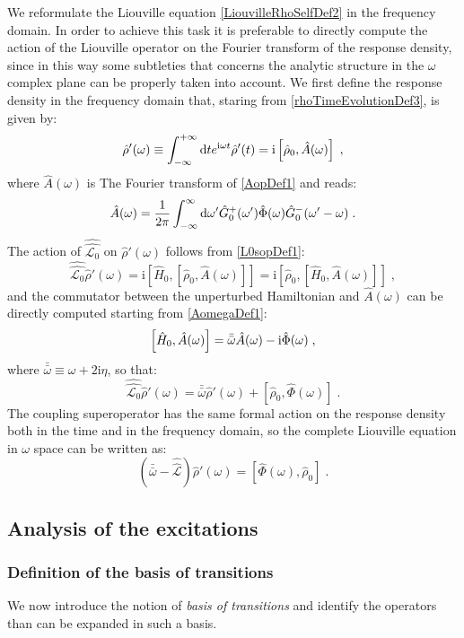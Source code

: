 \documentclass[a4paper]{article}
\newcommand{\dd}{{\rm d}}
\newcommand{\bbomega}{{\bar{\bar\omega}}}
\newcommand{\ii}{\mathrm{i}}
\newcommand{\intover}[1]{\int_{-\infty}^{+\infty} \dd {#1}}
\newcommand{\be}{\begin{equation}}
\newcommand{\ee}{\end{equation}}
\newcommand{\nn}{\notag}
\newcommand{\lb}{\label}
\newcommand{\op}[1]{\hat {#1}}
\newcommand{\sop}[1]{\op{\op {#1}}}
\newcommand{\commutator}[2]{\left[ {#1} , {#2} \right]}
\newcommand{\dmnot}{\op{\rho}_0}
\newcommand{\dm}{\op{\rho}}
\newcommand{\hnot}{\op{H}_0}
\newcommand{\Liouv}{\sop{\mathcal L}}
\newcommand{\Liouvnot}{\sop{\mathcal L_0}}
\begin{document}
We reformulate the Liouville equation \eqref{LiouvilleRhoSelfDef2} in the frequency domain. In order to achieve this task it is
preferable to directly compute the action of the Liouville operator on the Fourier transform of the response density, since in this
way some subtleties that concerns the analytic structure in the $\omega$ complex plane can be properly taken into account.
We first define the response density in the frequency domain that, staring from \eqref{rhoTimeEvolutionDef3}, is given by:
\be\lb{rhoPrimeOmegaDef1}
\dm'(\omega) \equiv \intover{t} e^{\ii \omega t} \dm'(t)
= \ii \commutator{\dmnot}{\op A(\omega)} \;,
\ee
where $\op A(\omega)$ is The Fourier transform of \eqref{AopDef1} and reads:
\be \lb{AomegaDef1}
\op A(\omega) = \frac{1}{2\pi} \int_{-\infty}^\infty  \dd \omega'
\op G_0^+(\omega') \op \Phi(\omega) \op G_0^-(\omega'-\omega)\;.
\ee
The action of $\Liouvnot$ on $\dm'(\omega)$ follows from \eqref{L0sopDef1}:
\be\lb{LiouvillianRhopomegaDef1}
\Liouvnot \dm'(\omega) = \ii \commutator{\hnot}{\commutator{\dmnot}{\op A(\omega)}} = 
\ii \commutator{\dmnot}{\commutator{\hnot}{\op A(\omega)}} \;,
\ee
and the commutator between the unperturbed Hamiltonian and $\op A(\omega)$ can be directly computed starting from \eqref{AomegaDef1}: 
\be
\commutator{\hnot }{\op A(\omega)} = \bbomega \op A(\omega) - \ii \op \Phi(\omega)\;, \nn
\ee
where $\bbomega \equiv \omega + 2\ii\eta$, so that:
\be\lb{LiouvillianRhopomegaDef2}
\Liouvnot \dm'(\omega) =  \bbomega\dm'(\omega) + \commutator{\dmnot}{\op\Phi(\omega)}\;.
\ee
The coupling superoperator has the same formal action on the response density both in the time and in the frequency domain, so the complete
Liouville equation in $\omega$ space can be written as:
\be\lb{LiouvillianRhopomegaDef3}
\left(\bbomega - \Liouv\right) \dm'(\omega) =  \commutator{\op\Phi(\omega)}{\dmnot}\;.
\ee

\subsection{Analysis of the excitations}

\subsubsection{Definition of the basis of transitions}

We now introduce the notion of \emph{basis of transitions} and identify the operators than can be expanded in such a basis. 
\end{document}
